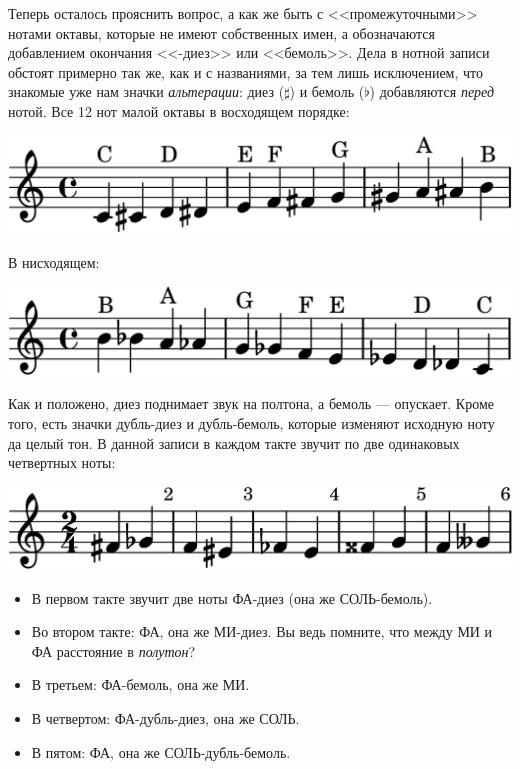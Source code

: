 Теперь осталось прояснить вопрос, а как же быть с <<промежуточными>> нотами октавы, которые не имеют собственных имен, а обозначаются добавлением окончания <<-диез>> или <<бемоль>>. Дела в нотной записи обстоят примерно так же, как и с названиями, за тем лишь исключением, что знакомые уже нам значки \emph{альтерации}: диез ($\sharp$) и бемоль ($\flat$) добавляются \emph{перед} нотой. Все 12 нот малой октавы в восходящем порядке:
\begin{center}    
    \includegraphics{fig/notes/octave-all-up}
\end{center}

В нисходящем:
\begin{center}    
    \includegraphics{fig/notes/octave-all-dn}
\end{center}

Как и положено, диез поднимает звук на полтона, а бемоль --- опускает. Кроме того, есть значки дубль-диез и дубль-бемоль, которые изменяют исходную ноту да целый тон. В данной записи в каждом такте звучит по две одинаковых четвертных ноты:
\begin{center}    
    \includegraphics{fig/notes/sharp-flat}
\end{center}

\begin{itemize}
    \item В первом такте звучит две ноты ФА-диез (она же СОЛЬ-бемоль).
    \item Во втором такте: ФА, она же МИ-диез. Вы ведь помните, что между МИ и ФА расстояние в \emph{полутон}?
    \item В третьем: ФА-бемоль, она же МИ.
    \item В четвертом: ФА-дубль-диез, она же СОЛЬ.
    \item В пятом: ФА, она же СОЛЬ-дубль-бемоль.
\end{itemize}

